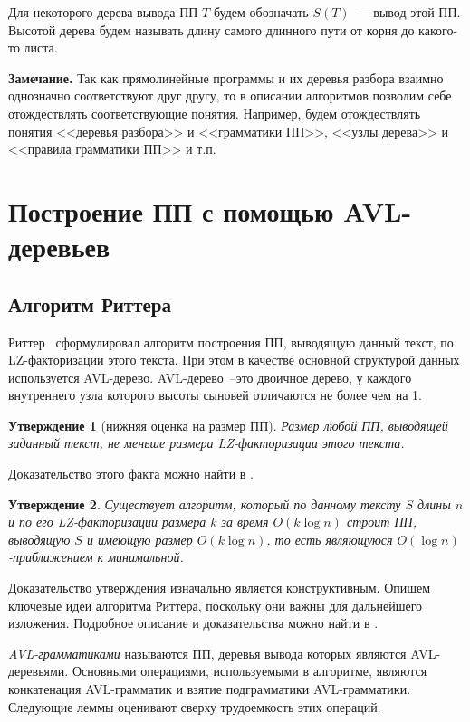 \documentclass[14pt]{article}
\newtheorem{claim}{Утверждение}[section]
\begin{document}
Для некоторого дерева вывода ПП $T$ будем обозначать $S(T)$~--- вывод этой ПП.
Высотой дерева будем называть длину самого длинного пути от корня до какого-то листа.

{\bf Замечание.} Так как прямолинейные программы и их деревья разбора взаимно однозначно соответствуют друг другу,
то в описании алгоритмов позволим себе отождествлять соответствующие понятия. Например, будем отождествлять понятия <<деревья разбора>> и
<<грамматики ПП>>, <<узлы дерева>> и <<правила грамматики ПП>> и т.п.

\section{Построение ПП с помощью AVL-деревьев}

\subsection{Алгоритм Риттера}

Риттер~\cite{RytterSLPConstruction} сформулировал алгоритм построения ПП, выводящую данный текст, по LZ-факторизации этого текста.
При этом в качестве основной структурой данных используется AVL-дерево. AVL-дерево~--это двоичное дерево, у каждого внутреннего узла которого
высоты сыновей отличаются не более чем на 1.

\begin{claim}[нижняя оценка на размер ПП]
	Размер любой ПП, выводящей заданный текст, не меньше размера LZ-факторизации этого текста.
\end{claim}

Доказательство этого факта можно найти в \cite{RytterSLPConstruction}.

\begin{claim}
Существует алгоритм, который по данному тексту $S$ длины $n$ и по его LZ-факторизации размера $k$ за время $O(k\log n)$
строит ПП, выводящую $S$ и имеющую размер $O(k\log n)$, то есть являющуюся $O(\log n)$-приближением к минимальной.
\end{claim}

Доказательство утверждения изначально является конструктивным. Опишем ключевые идеи алгоритма Риттера,
поскольку они важны для дальнейшего изложения. Подробное описание и доказательства можно найти в \cite{RytterSLPConstruction}.

\emph{AVL-грамматиками} называются ПП, деревья вывода которых являются AVL-деревьями. Основными операциями, используемыми
в алгоритме, являются конкатенация AVL-грам\-ма\-тик и взятие подграмматики AVL-грам\-ма\-тики. Следующие леммы
оценивают сверху трудоемкость этих операций.
\end{document}
